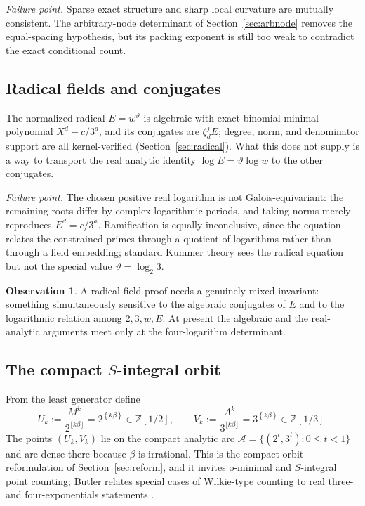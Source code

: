 \documentclass[11pt,oneside]{article}
\theoremstyle{definition}
\newtheorem{observation}[theorem]{Observation}
\theoremstyle{remark}
\newcommand{\Z}{\mathbb Z}
\newcommand{\thetaq}{\vartheta}
\newcommand{\fract}[1]{\left\{#1\right\}}
\begin{document}
\emph{Failure point.}  Sparse exact structure and sharp local curvature are mutually
consistent.  The arbitrary-node determinant of Section~\ref{sec:arbnode} removes the
equal-spacing hypothesis, but its packing exponent is still too weak to contradict the exact
conditional count.

\subsection{Radical fields and conjugates}
\label{at:radical}

The normalized radical $E=w^{\thetaq}$ is algebraic with exact binomial minimal polynomial
$X^{d}-c/3^{a}$, and its conjugates are $\zeta_d^{j}E$; degree, norm, and denominator
support are all kernel-verified (Section~\ref{sec:radical}).  What this does not supply is a
way to transport the real analytic identity $\log E=\thetaq\log w$ to the other conjugates.

\emph{Failure point.}  The chosen positive real logarithm is not Galois-equivariant: the
remaining roots differ by complex logarithmic periods, and taking norms merely reproduces
$E^{d}=c/3^{a}$.  Ramification is equally inconclusive, since the equation relates the
constrained primes through a quotient of logarithms rather than through a field embedding;
standard Kummer theory sees the radical equation but not the special value
$\thetaq=\log_2 3$.

\begin{observation}
\label{at:obs-radical}
A radical-field proof needs a genuinely mixed invariant: something simultaneously sensitive
to the algebraic conjugates of $E$ and to the logarithmic relation among $2,3,w,E$.  At
present the algebraic and the real-analytic arguments meet only at the four-logarithm
determinant.
\end{observation}

\subsection{The compact $S$-integral orbit}
\label{at:orbit}

From the least generator define
\[
  U_k:=\frac{M^{k}}{2^{\lfloor k\beta\rfloor}}=2^{\fract{k\beta}}\in\Z[1/2],
  \qquad
  V_k:=\frac{A^{k}}{3^{\lfloor k\beta\rfloor}}=3^{\fract{k\beta}}\in\Z[1/3].
\]
The points $(U_k,V_k)$ lie on the compact analytic arc
$\mathcal A=\{(2^{t},3^{t}):0\le t<1\}$ and are dense there because $\beta$ is irrational.
This is the compact-orbit reformulation of Section~\ref{sec:reform}, and it invites
o-minimal and $S$-integral point counting; Butler relates special cases of Wilkie-type
counting to real three- and four-exponentials statements \cite{Butler2017}.
\end{document}
